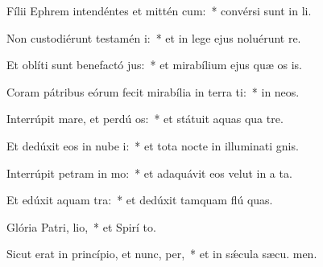\item Fílii Ephrem intendéntes et mittén cum:~* convérsi sunt in  li.
\item Non custodiérunt testamén i:~* et in lege ejus noluérunt re.
\item Et oblíti sunt benefactó jus:~* et mirabílium ejus quæ os is.
\item Coram pátribus eórum fecit mirabília in terra ti:~* in  neos.
\item Interrúpit mare, et perdú os:~* et státuit aquas qua  tre.
\item Et dedúxit eos in nube i:~* et tota nocte in illuminati gnis.
\item Interrúpit petram in mo:~* et adaquávit eos velut in a ta.
\item Et edúxit aquam  tra:~* et dedúxit tamquam flú quas.
\item Glória Patri,  lio,~* et Spirí to.
\item Sicut erat in princípio, et nunc,  per,~* et in sǽcula sæcu. men.

